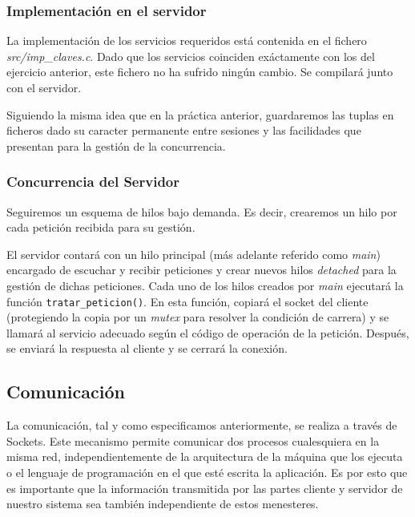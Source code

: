 \documentclass[]{article}
\begin{document}
\subsubsection{Implementación en el servidor}
\label{subsec::implementacion_servidor}

La implementación de los servicios requeridos está contenida en el fichero \textit{src/imp\_claves.c}. Dado que los servicios coinciden exáctamente con los del ejercicio anterior, este fichero no ha sufrido ningún cambio. Se compilará junto con el servidor. 

Siguiendo la misma idea que en la práctica anterior, guardaremos las tuplas en ficheros dado su caracter permanente entre sesiones y las facilidades que presentan para la gestión de la concurrencia.

\subsubsection{Concurrencia del Servidor}
\label{subsec::concurrencia_servidor}

Seguiremos un esquema de hilos bajo demanda. Es decir, crearemos un hilo por cada petición recibida para su gestión. 

El servidor contará con un hilo principal (más adelante referido como \textit{main}) encargado de escuchar y recibir peticiones y crear nuevos hilos \textit{detached} para la gestión de dichas peticiones. 
Cada uno de los hilos creados por \textit{main} ejecutará la función \texttt{tratar\_peticion()}. En esta función, copiará el socket del cliente (protegiendo la copia por un \textit{mutex} para resolver la condición de carrera) y se llamará al servicio adecuado según el código de operación de la petición. Después, se enviará la respuesta al cliente y se cerrará la conexión. 

\subsection{Comunicación}
\label{subsec:comunicacion}
La comunicación, tal y como especificamos anteriormente, se realiza a través de Sockets. Este mecanismo permite comunicar dos procesos cualesquiera en la misma red, independientemente de la arquitectura de la máquina que los ejecuta o el lenguaje de programación en el que esté escrita la aplicación. Es por esto que es importante que la información transmitida por las partes cliente y servidor de nuestro sistema sea también independiente de estos menesteres. 
\end{document}

